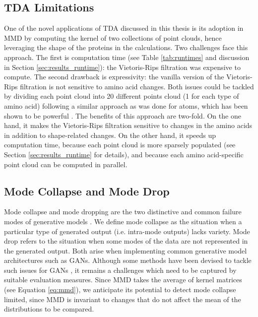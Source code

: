\subsection{TDA Limitations}\label{sec:tda_limitations}

One of the novel applications of TDA discussed in this thesis is its adoption in
MMD by computing the kernel of two collections of point clouds, hence leveraging
the shape of the proteins in the calculations. Two challenges face this
approach. The first is computation time (see Table \ref{tab:runtimes} and
discussion in Section \ref{sec:results_runtime}): the Vietoris-Rips filtration
was expensive to compute. The second drawback is expressivity: the vanilla
version of the Vietoris-Rips filtration is not sensitive to amino acid changes.
Both issues could be tackled by dividing each point cloud into 20 different
points cloud (1 for each type of amino acid) following a similar approach as was
done for atoms, which has been shown to be powerful \cite{jiang2021topological}.
The benefits of this approach are two-fold. On the one hand, it makes the
Vietoris-Rips filtration sensitive to changes in the amino acids in addition to
shape-related changes. On the other hand, it
speeds up computation time, because each point cloud is more sparsely populated
(see Section \ref{sec:results_runtime} for details), and because
each amino acid-specific point cloud can be computed in parallel.


\subsection{Mode Collapse and Mode Drop}

Mode collapse and mode dropping are the two distinctive and common failure modes
of generative models \citep{salimans2016improved}. We define mode collapse as
the situation when a particular type of generated output (i.e. intra-mode
outputs) lacks variety. Mode drop refers to the situation when some modes of the
data are not represented in the generated output. Both arise when implementing
common generative model architectures such as GANs. Although some methods have
been devised to tackle such issues for GANs \citep{arjovsky2017wasserstein,
goodfellow2014generative}, it remains a challenges which need to be captured by
suitable evaluation measures. Since MMD takes the average of kernel matrices
(see Equation \ref{eq:mmd}), we anticipate its potential to detect mode collapse
limited, since MMD is invariant to changes that do not affect the mean of the
distributions to be compared.

